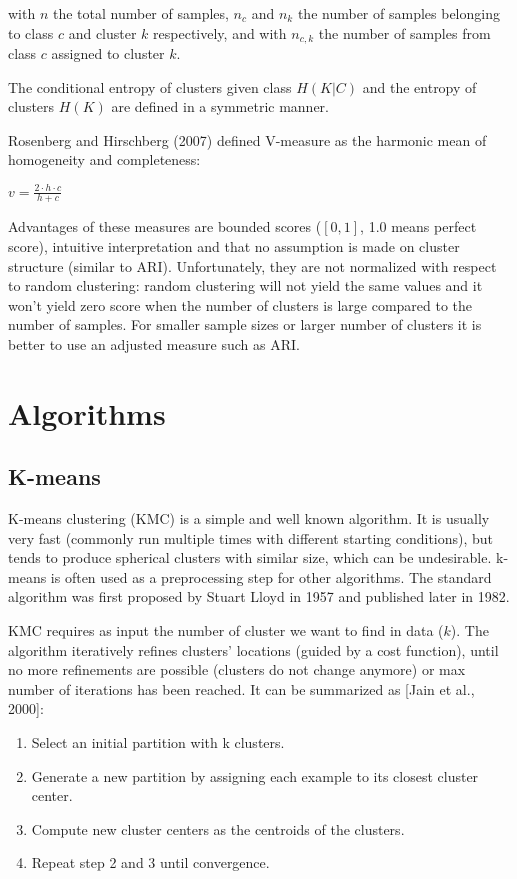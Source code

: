\documentclass[conference]{IEEEtran}
\begin{document}
with $n$ the total number of samples, $n_c$ and $n_k$ the number of samples belonging to class
$c$ and cluster $k$ respectively, and with $n_{c,k}$ the number of samples from class $c$ assigned
to cluster $k$.

The conditional entropy of clusters given class $H(K|C)$ and the entropy of clusters $H(K)$ are
defined in a symmetric manner.

Rosenberg and Hirschberg (2007) defined V-measure as the harmonic mean of homogeneity and completeness:

$v = \frac{2 \cdot h \cdot c}{h+c}$

Advantages of these measures are bounded scores ($[0, 1]$, 1.0 means perfect score), intuitive interpretation and that
no assumption is made on cluster structure (similar to ARI). Unfortunately, they are not normalized
with respect to random clustering: random clustering will not yield the same values and it won't
yield zero score when the number of clusters is large compared to the number of samples. For smaller
sample sizes or larger number of clusters it is better to use an adjusted measure such as ARI.

\section{Algorithms}
\subsection{K-means}
K-means clustering (KMC) is a simple and well known algorithm. It is usually very
fast (commonly run multiple times with different starting conditions), but tends
to produce spherical clusters with similar size, which can be undesirable.
k-means is often used as a preprocessing step for other algorithms. The standard
algorithm was first proposed by Stuart Lloyd in 1957 and published later in 1982.

KMC requires as input the number of cluster we want to find in data ($k$).
The algorithm iteratively refines clusters' locations (guided by a cost function),
until no more refinements are possible (clusters do not change anymore)
or max number of iterations has been reached. It can be summarized as [Jain et al., 2000]:

\begin{enumerate}
    \item Select an initial partition with k clusters.
    \item Generate a new partition by assigning each example to its closest cluster center.
    \item Compute new cluster centers as the centroids of the clusters.
    \item Repeat step 2 and 3 until convergence.
\end{enumerate}
\end{document}
